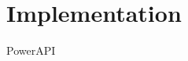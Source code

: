 \section{Implementation}
\label{sec:Implementation}
PowerAPI \cite{powerapi-website}\cite{powerapi-github}
